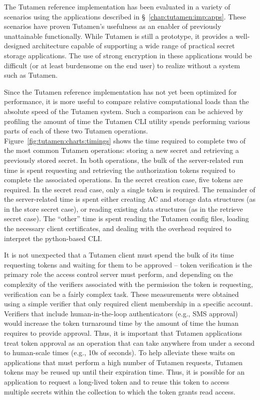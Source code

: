 The Tutamen reference implementation has been evaluated in a variety
of scenarios using the applications described in
\S~\ref{chap:tutamen:imp:apps}. These scenarios have proven Tutamen's
usefulness as an enabler of previously unattainable
functionally. While Tutamen is still a prototype, it provides a
well-designed architecture capable of supporting a wide range of
practical secret storage applications. The use of strong encryption in
these applications would be difficult (or at least burdensome on the
end user) to realize without a system such as Tutamen.

Since the Tutamen reference implementation has not yet been optimized
for performance, it is more useful to compare relative computational
loads than the absolute speed of the Tutamen system. Such a comparison
can be achieved by profiling the amount of time the Tutamen CLI
utility spends performing various parts of each of these two Tutamen
operations. Figure~\ref{fig:tutamen:charts:timings} shows the time
required to complete two of the most common Tutamen operations:
storing a new secret and retrieving a previously stored secret. In
both operations, the bulk of the server-related run time is spent
requesting and retrieving the authorization tokens required to
complete the associated operations. In the secret creation case, five
tokens are required. In the secret read case, only a single token is
required. The remainder of the server-related time is spent either
creating AC and storage data structures (as in the store secret case),
or reading existing data structures (as in the retrieve secret
case). The ``other'' time is spent reading the Tutamen config files,
loading the necessary client certificates, and dealing with the
overhead required to interpret the python-based CLI.

It is not unexpected that a Tutamen client must spend the bulk of its
time requesting tokens and waiting for them to be approved -- token
verification is the primary role the access control server must
perform, and depending on the complexity of the verifiers associated
with the permission the token is requesting, verification can be a
fairly complex task. These measurements were obtained using a simple
verifier that only required client membership in a specific
account. Verifiers that include human-in-the-loop authenticators
(e.g., SMS approval) would increase the token turnaround time by the
amount of time the human requires to provide approval. Thus, it is
important that Tutamen applications treat token approval as an
operation that can take anywhere from under a second to human-scale
times (e.g., 10s of seconds). To help alleviate these waits on
applications that must perform a high number of Tutamen requests,
Tutamen tokens may be reused up until their expiration time. Thus, it
is possible for an application to request a long-lived token and to
reuse this token to access multiple secrets within the collection to
which the token grants read access.

